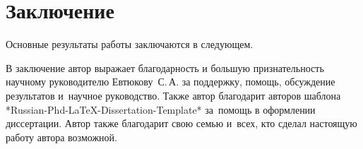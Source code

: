 \chapter*{Заключение}                       %


Основные результаты работы заключаются в следующем.


В заключение автор
выражает благодарность и большую признательность научному руководителю
Евтюкову~С.\,А. за поддержку, помощь, обсуждение результатов и~научное
руководство. Также автор благодарит авторов шаблона
*Russian-Phd-LaTeX-Dissertation-Template* за~помощь в оформлении
диссертации. Автор также благодарит свою семью
и~всех, кто сделал настоящую работу автора возможной.
